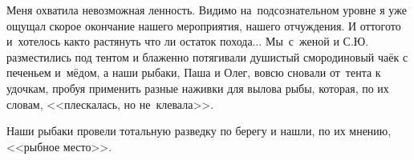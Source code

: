 Меня охватила невозможная ленность. Видимо на~подсознательном уровне я уже ощущал скорое окончание нашего мероприятия, нашего отчуждения. И оттого\sdash то и~хотелось как\sdash то растянуть что ли остаток похода$\ldots$ Мы~с~женой и С.Ю. разместились под тентом и блаженно потягивали душистый смородиновый чаёк с печеньем и~мёдом, а наши рыбаки, Паша и Олег, вовсю сновали от~тента к удочкам, пробуя применить разные наживки для вылова рыбы, которая, по их словам, <<плескалась, но не~клевала>>.

Наши рыбаки провели тотальную разведку по берегу и нашли, по их мнению, <<рыбное место>>. 



\begin{center}
\end{center}
